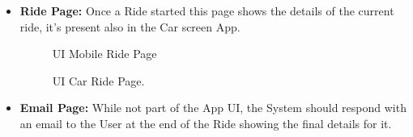 \documentclass[a4paper]{article}
\begin{document}
\begin {itemize}
\item \textbf{Ride Page:} Once a Ride started this page shows the details of the current ride, it's present also in the Car screen App.
\begin{figure}[h!]
\centering
\vspace*{\fill}
\noindent{}%
\caption {UI Mobile Ride Page}
\vspace*{0.2cm}
\end{figure}
\pagebreak
\begin{figure}[h!]
\centering
\vspace*{\fill}
\noindent{}%
\caption {UI Car Ride Page.}
\vspace*{0.2cm}
\end{figure}
\item \textbf{Email Page:} While not part of the App UI, the System should respond with an email to the User at the end of the Ride showing the final details for it.
\begin{figure}[h!]

\end{figure}
\end{itemize}
\end{document}
